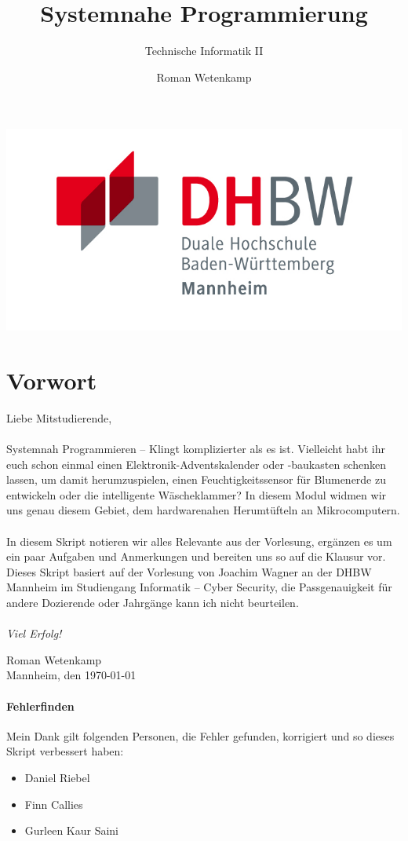 \documentclass[11pt,a4paper]{scrartcl}
\author{Roman Wetenkamp}
\title{Systemnahe Programmierung}
\subtitle{Technische Informatik II}
\begin{document}
\vspace{3cm}
\maketitle
\begin{center}
\includegraphics[scale=0.7]{DHBW.jpg}
\end{center}
\pagebreak
\tableofcontents
\pagebreak
\section*{Vorwort}
Liebe Mitstudierende, \\\\
Systemnah Programmieren -- Klingt komplizierter als es ist. Vielleicht habt ihr euch schon einmal einen Elektronik-Adventskalender oder -baukasten schenken lassen, um damit herumzuspielen, einen Feuchtigkeitssensor für Blumenerde zu entwickeln oder die intelligente Wäscheklammer? In diesem Modul widmen wir uns genau diesem Gebiet, dem hardwarenahen Herumtüfteln an Mikrocomputern. \\\\
In diesem Skript notieren wir alles Relevante aus der Vorlesung, ergänzen es um ein paar Aufgaben und Anmerkungen und bereiten uns so auf die Klausur vor. Dieses Skript basiert auf der Vorlesung von Joachim Wagner an der DHBW Mannheim im Studiengang Informatik -- Cyber Security, die Passgenauigkeit für andere Dozierende oder Jahrgänge kann ich nicht beurteilen. \\\\
\textit{Viel Erfolg!}  \\
\begin{flushright}
Roman Wetenkamp \\
Mannheim, den \today
\end{flushright}  
\vfill
\paragraph{Fehlerfinden}
Mein Dank gilt folgenden Personen, die Fehler gefunden, korrigiert und so dieses Skript verbessert haben: 
\begin{itemize}
\item Daniel Riebel
\item Finn Callies
\item Gurleen Kaur Saini
\end{itemize}
\end{document}
